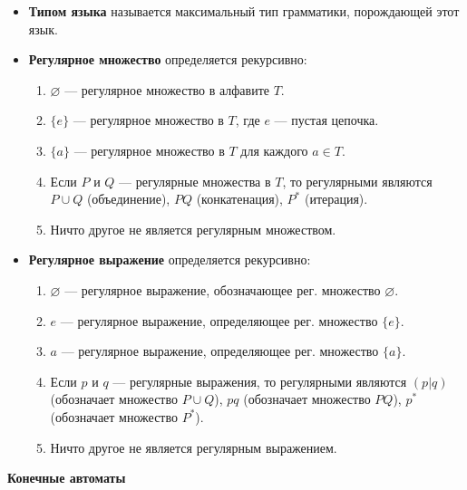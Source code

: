 \begin{itemize}
\begin{description}
    \end{description}
    \item \textbf{Типом языка} называется максимальный тип грамматики, порождающей этот язык.
    \item \textbf{Регулярное множество} определяется рекурсивно:
    \begin{enumerate}
        \item $\varnothing$ --- регулярное множество в алфавите $T$.
        \item $\{e\}$ --- регулярное множество в $T$, где $e$ --- пустая цепочка.
        \item $\{a\}$ --- регулярное множество в $T$ для каждого $a \in T$.
        \item Если $P$ и $Q$ --- регулярные множества в $T$, то регулярными являются $P \cup Q$ (объединение), $P Q$ (конкатенация), $P^\ast$ (итерация).
        \item Ничто другое не является регулярным множеством.
    \end{enumerate}
    \item \textbf{Регулярное выражение} определяется рекурсивно:
    \begin{enumerate}
        \item $\varnothing$ --- регулярное выражение, обозначающее рег. множество $\varnothing$.
        \item $e$ --- регулярное выражение, определяющее рег. множество $\{e\}$.
        \item $a$ --- регулярное выражение, определяющее рег. множество $\{a\}$.
        \item Если $p$ и $q$ --- регулярные выражения, то регулярными являются $(p | q)$ (обозначает множество $P \cup Q$), $p q$ (обозначает множество $P Q$), $p^\ast$ (обозначает множество $P^\ast$).
        \item Ничто другое не является регулярным выражением.
    \end{enumerate}
\end{itemize}

\textbf{Конечные автоматы}

